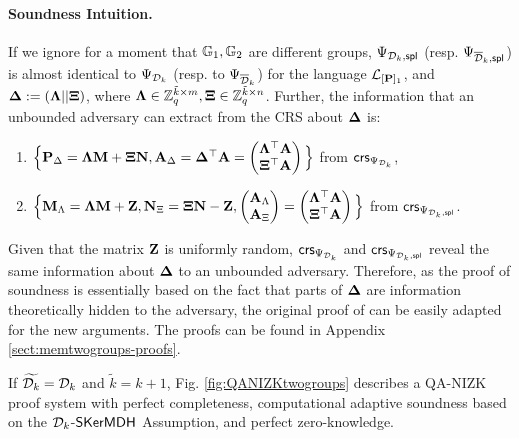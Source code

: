 \paragraph{Soundness Intuition.}   If we ignore for a moment that ${\mathbb{G}_1}, {\mathbb{G}_2}$ are different groups, $\Psi_{\mathcal{D}_k,\mathsf{spl}}$ (resp. $\Psi_{\overline{\mathcal{D}}_k,\mathsf{spl}}$) is almost identical to $\Psi_{\mathcal{D}_k}$ (resp. to $\Psi_{\overline{\mathcal{D}}_k}$) for the language $\mathcal{L}_{[\mathbf{{P}}]_1}$, and $\mathbf{{\Delta}}:=(\mathbf{{\Lambda}}||\mathbf{{\Xi}})$, where  $\mathbf{{\Lambda}} \in \mathbb{Z}_q^{\tilde{k} \times m},\mathbf{{\Xi}} \in \mathbb{Z}_q^{\tilde{k} \times n}$. Further, the information that an unbounded adversary can extract from the CRS about $\mathbf{{\Delta}}$ is:
 \begin{enumerate}
 \item $\Big\{\mathbf{{P}}_\Delta= \mathbf{{\Lambda}} \mathbf{{M}}+ \mathbf{{\Xi}}\mathbf{{N}}, \mathbf{{A}}_{\Delta} = \mathbf{{\Delta}}^{\top}\mathbf{{A}} =\begin{pmatrix} \mathbf{{\Lambda}}^{\top}\mathbf{{A}} \\ \mathbf{{\Xi}}^{\top}\mathbf{{A}} \end{pmatrix}\Big\}$ from $\mathsf{crs}_{\Psi_{\mathcal{D}_k}}$, 
 \item $\Big\{ \mathbf{{M}}_\Lambda = \mathbf{{\Lambda}} \mathbf{{M}}+\mathbf{{Z}}, \mathbf{{N}}_\Xi = \mathbf{{\Xi}}\mathbf{{N}}-\mathbf{{Z}},  \begin{pmatrix}\mathbf{{A}}_\Lambda\\\mathbf{{A}}_\Xi\end{pmatrix} = \begin{pmatrix} \mathbf{{\Lambda}}^{\top}\mathbf{{A}} \\ \mathbf{{\Xi}}^{\top}\mathbf{{A}} \end{pmatrix} \Big\}$ from $\mathsf{crs}_{\Psi_{\mathcal{D}_k,\mathsf{spl}}}$. 
 \end{enumerate}
Given that the matrix $\mathbf{{Z}}$ is uniformly random,  $\mathsf{crs}_{\Psi_{\mathcal{D}_k}}$ and $\mathsf{crs}_{\Psi_{\mathcal{D}_k,\mathsf{spl}}}$
reveal the same information about $\mathbf{{\Delta}}$ to an unbounded adversary. Therefore, as the proof of soundness is essentially based on the fact that parts of $\mathbf{{\Delta}}$ are information theoretically hidden to the adversary, the original proof of \cite{EC:KilWee15} can be easily adapted for the new arguments. The proofs 
can be found in Appendix \ref{sect:memtwogroups-proofs}.


\begin{theorem} If $\widetilde{\mathcal{D}_{k}}=\mathcal{D}_k$ and $\tilde{k}=k+1$,  Fig. \ref{fig:QANIZKtwogroups} describes a QA-NIZK
proof system with perfect completeness, computational adaptive soundness based on the  $\mathcal{D}_{k}$-$\mathsf{SKerMDH}$ Assumption, and perfect zero-knowledge. 
\label{theo:membtwogroups1}
\end{theorem}

